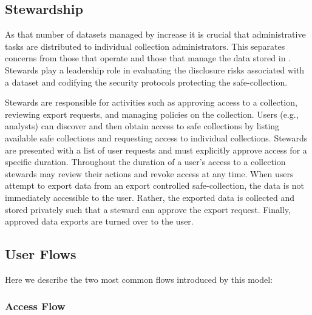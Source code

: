 \subsection{Stewardship}

As that number of datasets managed by \NAME increase it is crucial that administrative
tasks are distributed to individual collection administrators. This separates
concerns from those that operate \NAME and those that manage the data stored in \NAMENS.
Stewards play a leadership role in evaluating the disclosure risks associated with a
dataset and codifying the security protocols protecting the safe-collection.

Stewards are responsible for activities such as approving access to a collection, reviewing
export requests, and managing policies on the collection. Users (e.g., analysts) can discover
and then obtain access to safe collections by listing available safe collections and requesting
access to individual collections. 
Stewards are presented with a list of user requests and must explicitly approve access
for a specific duration. Throughout the duration of a user's access to a collection
stewards may review their actions and revoke access at any time. When users attempt
to export data from an export controlled safe-collection, the data is not immediately
accessible to the user. Rather, the exported data is collected and stored privately
such that a steward can approve the export request. Finally, approved data exports
are turned over to the user. 


\subsection{User Flows}

Here we describe the two most common flows introduced by this model:

\subsubsection{Access Flow}

